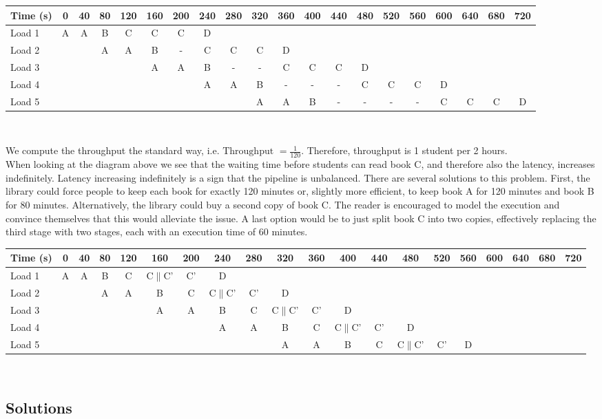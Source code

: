 \documentclass[main.tex]{subfiles}
\begin{document}
\begin{ExerciseList}
\begin{small}
\begin{tabular}{l | *{19}{c}}
                    Time (s) & 0 & 40 & 80 & 120 & 160 & 200 & 240 & 280 & 320 & 360 & 400 & 440 & 480 & 520 & 560 & 600 & 640 & 680 & 720 \\
                    \hline
                    Load 1 & A & A & B & C & C & C & D\\
                    Load 2 &   &   & A & A & B & - & C & C & C & D\\
                    Load 3 &   &   &   &   & A & A & B & - & - & C & C & C & D \\
                    Load 4 &   &   &   &   &   &   & A & A & B & - & - & - & C & C & C & D \\
                    Load 5 &   &   &   &   &   &   &   &   & A & A & B & - & - & - & - & C & C & C & D
                \end{tabular} \\[3mm]
            \end{small}
            We compute the throughput the standard way, i.e. $\text{Throughput } = \frac{1}{120}$. Therefore, throughput is 1 student per 2 hours.\\[3mm]
            When looking at the diagram above we see that the waiting time before students can read book C, and therefore also the latency, increases indefinitely.
        \Question Latency increasing indefinitely is a sign that the pipeline is unbalanced. There are several solutions to this problem. First, the library could force people to keep each book for exactly 120 minutes or, slightly more efficient, to keep book A for 120 minutes and book B for 80 minutes. Alternatively, the library could buy a second copy of book C. The reader is encouraged to model the execution and convince themselves that this would alleviate the issue. A last option would be to just split book C into two copies, effectively replacing the third stage with two stages, each with an execution time of 60 minutes.\\[3mm]
            \begin{small}
                \begin{tabular}{l | *{19}{c}}
                    Time (s) & 0 & 40 & 80 & 120 & 160 & 200 & 240 & 280 & 320 & 360 & 400 & 440 & 480 & 520 & 560 & 600 & 640 & 680 & 720 \\
                    \hline
                    Load 1 & A & A & B & C & C$\|$C' & C' & D\\
                    Load 2 &   &   & A & A & B & C & C$\|$C' & C' & D\\
                    Load 3 &   &   &   &   & A & A & B & C & C$\|$C' & C' & D \\
                    Load 4 &   &   &   &   &   &   & A & A & B & C & C$\|$C' & C' & D \\
                    Load 5 &   &   &   &   &   &   &   &   & A & A & B & C & C$\|$C' & C' & D
                \end{tabular} \\[3mm]
            \end{small}
\end{ExerciseList}
\newpage
\subsection{Solutions}
\shipoutAnswer
\end{document}
